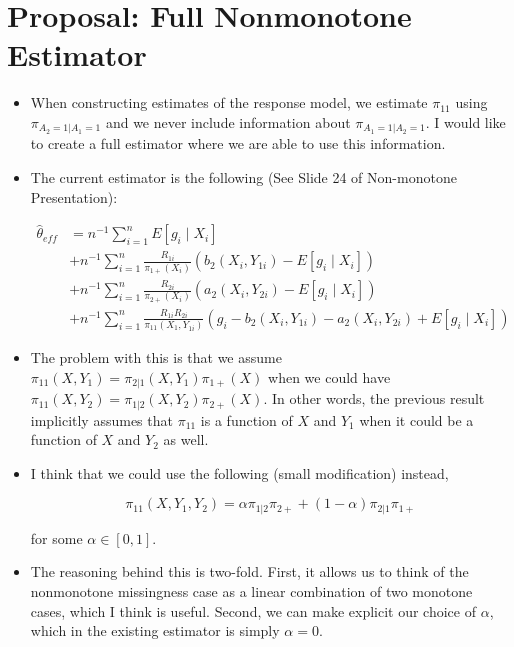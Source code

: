 \section*{Proposal: Full Nonmonotone Estimator}

\begin{itemize}

  \item When constructing
    estimates of the response model, we estimate $\pi_{11}$ using
    $\pi_{A_2 = 1|A_1 = 1}$ and we never include information about $\pi_{A_1 =
    1|A_2 = 1}$. I would like to create a full estimator where we are able to
    use this information.

  \item The current estimator is the following (See Slide 24 of Non-monotone
    Presentation):

    \begin{align*}
      \hat \theta_{eff} &= n^{-1} \sum_{i = 1}^n E[g_i \mid X_i] \\
      &+ n^{-1} \sum_{i = 1}^n \frac{R_{1i}}{\pi_{1+}(X_i)} (b_2(X_i, Y_{1i}) - 
      E[g_i \mid X_i]) \\
      &+ n^{-1} \sum_{i = 1}^n \frac{R_{2i}}{\pi_{2+}(X_i)} (a_2(X_i, Y_{2i}) -
      E[g_i \mid X_i]) \\
      &+ n^{-1} \sum_{i = 1}^n \frac{R_{1i} R_{2i}}{\pi_{11}(X_1, Y_{1i})}(g_i 
      - b_2(X_i, Y_{1i}) - a_2(X_i, Y_{2i}) + E[g_i \mid X_i])
    \end{align*}

  \item The problem with this is that we assume $\pi_{11}(X, Y_{1}) =
    \pi_{2|1} (X, Y_{1}) \pi_{1+}(X)$ when we could have $\pi_{11}(X, Y_2) =
    \pi_{1|2} (X, Y_2) \pi_{2+}(X)$. In other words, the previous result
    implicitly assumes that $\pi_{11}$ is a function of $X$ and $Y_1$ when it
    could be a function of $X$ and $Y_2$ as well. 

  \item I think that we could use the
    following (small modification) instead,

    \[\pi_{11}(X, Y_1, Y_2) = \alpha \pi_{1|2} \pi_{2+} + (1 - \alpha) \pi_{2|1}
    \pi_{1+}\]

    for some $\alpha \in [0, 1]$.
    
  \item The reasoning behind this is two-fold. First, it allows us to think of
    the nonmonotone missingness case as a linear combination of two monotone
    cases, which I think is useful. Second, we can make explicit our choice of
    $\alpha$, which in the existing estimator is simply $\alpha = 0$.


\end{itemize}
